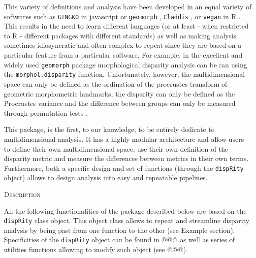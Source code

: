 \documentclass[12pt,letterpaper]{article}
\renewcommand{\section}[1]{%
\bigskip
\begin{center}
\begin{Large}
\normalfont\scshape #1
\medskip
\end{Large}
\end{center}}
\newcommand{\disp}{\texttt{dispRity} }
\begin{document}
This variety of definitions and analysis have been developed in an equal variety of softwares such as \texttt{GINGKO} in javascript \citep{bouxin2005ginkgo,de2007ginkgo} or \texttt{geomorph} \citep{adams2013geomorph,adams2017geometric}, \texttt{Claddis} \citep{Claddis}, or \texttt{vegan} \citep{oksanen2007vegan} in R \citep{R}.
This results in the need to learn different languages (or at least - when restricted to R - different packages with different standards) as well as making analysis sometimes idiosyncratic and often complex to repeat since they are based on a particular feature from a particular software.
For example, in the excellent and widely used \texttt{geomorph} package morphological disparity analysis can be ran using the \texttt{morphol.disparity} function.
Unfortunately, however, the multidimensional space can only be defined as the ordination of the procrustes transform of geometric morphometric landmarks, the disparity can only be defined as the Procrustes variance and the difference between groups can only be measured through permutation tests \citep{zelditch2012geometric,adams2013geomorph,adams2017geometric}.

This package, is the first, to our knowledge, to be entirely dedicate to multidimensional analysis.
It has a highly modular architecture and allow users to define their own multidimensional space, use their own definition of the disparity metric and measure the differences between metrics in their own terms.
Furthermore, both a specific design and set of functions (through the \disp object) allows to design analysis into easy and repeatable pipelines.

\section{Description}
All the following functionalities of the package described below are based on the \disp class object.
This object class allows to repeat and streamline disparity analysis by being past from one function to the other (see Example section).
Specificities of the \disp object can be found in @@@ as well as series of utilities functions allowing to modify such object (see @@@).
\end{document}
